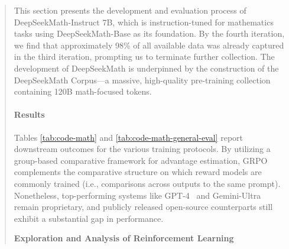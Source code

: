 \begin{abstract}
\begin{itemize}[topsep=0pt]
\begin{itemize}[topsep=0pt]
This section presents the development and evaluation process of DeepSeekMath-Instruct 7B, which is instruction-tuned for mathematics tasks using DeepSeekMath-Base as its foundation. By the fourth iteration, we find that approximately 98\% of all available data was already captured in the third iteration, prompting us to terminate further collection. The development of DeepSeekMath is underpinned by the construction of the DeepSeekMath Corpus—a massive, high-quality pre-training collection containing 120B math-focused tokens. \end{itemize}

\paragraph{Results}
Tables \ref{tab:code-math} and \ref{tab:code-math-general-eval} report downstream outcomes for the various training protocols. By utilizing a group-based comparative framework for advantage estimation, GRPO complements the comparative structure on which reward models are commonly trained (i.e., comparisons across outputs to the same prompt). Nonetheless, top-performing systems like GPT-4~\citep{gpt4} and Gemini-Ultra~\citep{gemini} remain proprietary, and publicly released open-source counterparts still exhibit a substantial gap in performance. \end{itemize}

\textbf{Exploration and Analysis of Reinforcement Learning}


\end{abstract}
